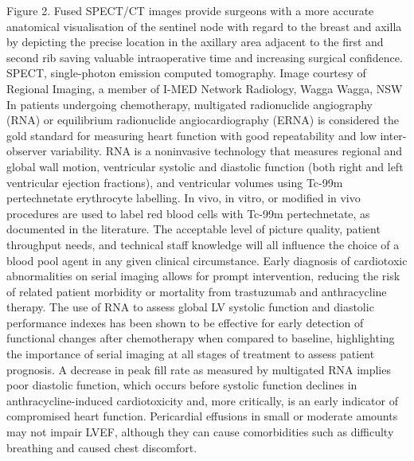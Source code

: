 \documentclass{article}
\begin{document}
Figure 2. Fused SPECT/CT images provide surgeons with a more accurate anatomical visualisation of 
the sentinel node with regard to the breast and axilla by depicting the precise location in the axillary 
area adjacent to the first and second rib saving valuable intraoperative time and increasing surgical 
confidence. SPECT, single-photon emission computed tomography. Image courtesy of Regional 
Imaging, a member of I-MED Network Radiology, Wagga Wagga, NSW
In patients undergoing chemotherapy, multigated radionuclide angiography (RNA) or 
equilibrium radionuclide angiocardiography (ERNA) is considered the gold standard for 
measuring heart function with good repeatability and low inter-observer variability. RNA is a 
noninvasive technology that measures regional and global wall motion, ventricular systolic 
and diastolic function (both right and left ventricular ejection fractions), and ventricular 
volumes using Tc-99m pertechnetate erythrocyte labelling. In vivo, in vitro, or modified in 
vivo procedures are used to label red blood cells with Tc-99m pertechnetate, as 
documented in the literature. The acceptable level of picture quality, patient throughput 
needs, and technical staff knowledge will all influence the choice of a blood pool agent in 
any given clinical circumstance.
Early diagnosis of cardiotoxic abnormalities on serial imaging allows for prompt 
intervention, reducing the risk of related patient morbidity or mortality from trastuzumab 
and anthracycline therapy. The use of RNA to assess global LV systolic function and diastolic 
performance indexes has been shown to be effective for early detection of functional 
changes after chemotherapy when compared to baseline, highlighting the importance of 
serial imaging at all stages of treatment to assess patient prognosis. A decrease in peak fill 
rate as measured by multigated RNA implies poor diastolic function, which occurs before 
systolic function declines in anthracycline-induced cardiotoxicity and, more critically, is an 
early indicator of compromised heart function. Pericardial effusions in small or moderate 
amounts may not impair LVEF, although they can cause comorbidities such as difficulty 
breathing and caused chest discomfort.
\end{document}
